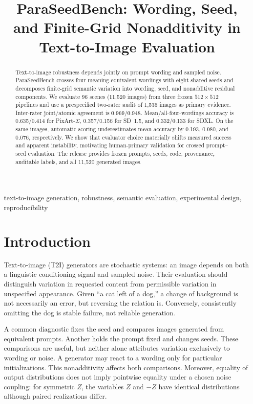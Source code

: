 \documentclass[10pt,letterpaper]{article}
\title{ParaSeedBench: Wording, Seed, and Finite-Grid Nonadditivity in Text-to-Image Evaluation}
\begin{document}
\maketitle

\begin{abstract}
Text-to-image robustness depends jointly on prompt wording and sampled noise. ParaSeedBench crosses four meaning-equivalent wordings with eight shared seeds and decomposes finite-grid semantic variation into wording, seed, and nonadditive residual components. We evaluate 96 scenes (11,520 images) from three frozen $512\times512$ pipelines and use a prespecified two-rater audit of 1,536 images as primary evidence. Inter-rater joint/atomic agreement is 0.969/0.948. Mean/all-four-wordings accuracy is 0.635/0.414 for PixArt-$\Sigma$, 0.357/0.156 for SD~1.5, and 0.332/0.133 for SDXL. On the same images, automatic scoring underestimates mean accuracy by 0.193, 0.080, and 0.076, respectively. We show that evaluator choice materially shifts measured success and apparent instability, motivating human-primary validation for crossed prompt--seed evaluation. The release provides frozen prompts, seeds, code, provenance, auditable labels, and all 11,520 generated images.
\end{abstract}

\begin{keywords}
text-to-image generation, robustness, semantic evaluation, experimental design, reproducibility
\end{keywords}

\section{Introduction}
Text-to-image (T2I) generators are stochastic systems: an image depends on both a linguistic conditioning signal and sampled noise. Their evaluation should distinguish variation in requested content from permissible variation in unspecified appearance. Given ``a cat left of a dog,'' a change of background is not necessarily an error, but reversing the relation is. Conversely, consistently omitting the dog is stable failure, not reliable generation.

A common diagnostic fixes the seed and compares images generated from equivalent prompts. Another holds the prompt fixed and changes seeds. These comparisons are useful, but neither alone attributes variation exclusively to wording or noise. A generator may react to a wording only for particular initializations. This nonadditivity affects both comparisons. Moreover, equality of output distributions does not imply pointwise equality under a chosen noise coupling: for symmetric $Z$, the variables $Z$ and $-Z$ have identical distributions although paired realizations differ.
\end{document}
